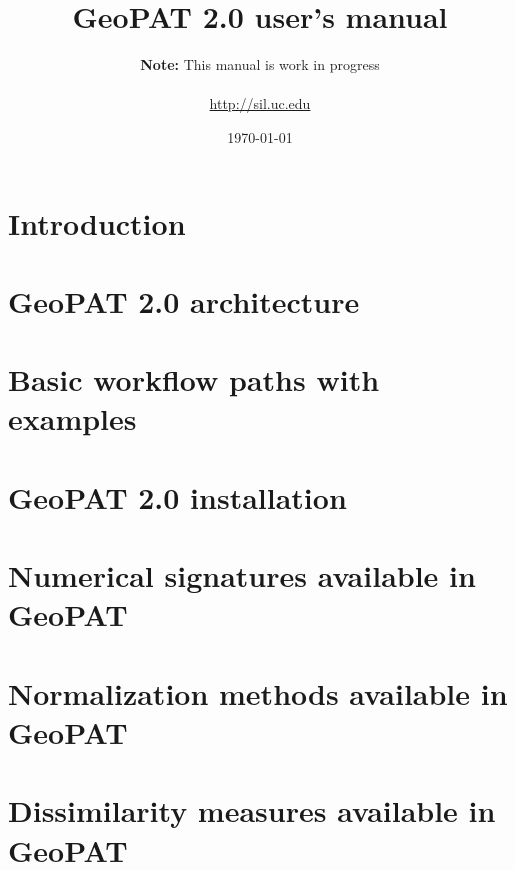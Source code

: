 \documentclass[12pt,margin=0.5in]{article}
\title{GeoPAT 2.0 user's manual}
\author{{\bf Note:} This manual is work in progress \\ \\ \url{http://sil.uc.edu}}
\date{\today}
\begin{document}
\maketitle
\newpage

\tableofcontents
\newpage

\section{Introduction}


\section{GeoPAT 2.0 architecture}


\section{Basic workflow paths with examples}


\FloatBarrier

\begin{appendices}

\section{GeoPAT 2.0 installation}


\section{Numerical signatures available in GeoPAT \label{signatures}} 


\section{Normalization methods available in GeoPAT \label{normalization}} 


\section{Dissimilarity measures available in GeoPAT \label{measures}}


\end{appendices}

\newpage

\printbibliography[heading=bibintoc,title={References}]
\end{document}
